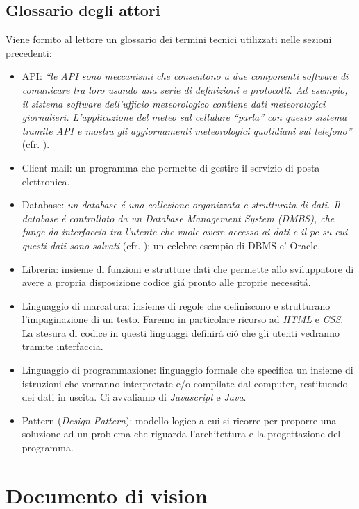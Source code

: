 \documentclass[12pt]{article}
\begin{document}
\subsection{Glossario degli attori}

Viene fornito al lettore un glossario dei termini tecnici utilizzati nelle sezioni precedenti:
\begin{itemize}
	\item API: \textit{``le API sono meccanismi che consentono a due componenti software di comunicare tra loro usando una serie di definizioni e protocolli. Ad esempio, il sistema software dell'ufficio meteorologico contiene dati meteorologici giornalieri. L'applicazione del meteo sul cellulare ``parla'' con questo sistema tramite API e mostra gli aggiornamenti meteorologici quotidiani sul telefono''} (cfr. \cite{bworld}).
	\item Client mail: un programma che permette di gestire il servizio di posta elettronica.
	\item Database: \textit{un database \'e una collezione organizzata e strutturata di dati. Il database \'e controllato da un Database Management System (DMBS), che funge da interfaccia tra l'utente che vuole avere accesso ai dati e il pc su cui questi dati sono salvati} (cfr. \cite{database}); un celebre esempio di DBMS e' Oracle. 
	\item Libreria: insieme di funzioni e strutture dati che permette allo sviluppatore di avere a propria disposizione codice gi\'a pronto alle proprie necessit\'a.
	\item Linguaggio di marcatura: insieme di regole che definiscono e strutturano l'impaginazione di un testo. Faremo in particolare ricorso ad \textit{HTML} e \textit{CSS}. La stesura di codice in questi linguaggi definir\'a ci\'o che gli utenti vedranno tramite interfaccia.
	\item Linguaggio di programmazione: linguaggio formale che specifica un insieme di istruzioni che vorranno interpretate e/o compilate dal computer, restituendo dei dati in uscita. Ci avvaliamo di \textit{Javascript} e \textit{Java}.
	\item Pattern (\textit{Design Pattern}): modello logico a cui si ricorre per proporre una soluzione ad un problema che riguarda l'architettura e la progettazione del programma. 
\end{itemize}


\section{Documento di vision}
\end{document}
